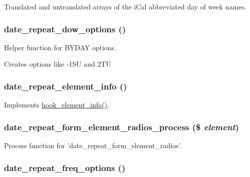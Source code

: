 Translated and untranslated arrays of the iCal abbreviated day of week names. \hypertarget{date__repeat_8module_a0db2cd4cff89bce5add79b4e73a10535}{
\subsubsection[{date\_\-repeat\_\-dow\_\-options}]{\setlength{\rightskip}{0pt plus 5cm}date\_\-repeat\_\-dow\_\-options ()}}
\label{date__repeat_8module_a0db2cd4cff89bce5add79b4e73a10535}
Helper function for BYDAY options.

Creates options like -\/1SU and 2TU \hypertarget{date__repeat_8module_ac3359bf013cf5935d9e568b487ac998d}{
\subsubsection[{date\_\-repeat\_\-element\_\-info}]{\setlength{\rightskip}{0pt plus 5cm}date\_\-repeat\_\-element\_\-info ()}}
\label{date__repeat_8module_ac3359bf013cf5935d9e568b487ac998d}
Implements \hyperlink{group__hooks_ga3c5182432eddc82f8b7845e66a365d51}{hook\_\-element\_\-info()}. \hypertarget{date__repeat_8module_a8cfb8bcf609bee5a14b40fd7b6d918d1}{
\subsubsection[{date\_\-repeat\_\-form\_\-element\_\-radios\_\-process}]{\setlength{\rightskip}{0pt plus 5cm}date\_\-repeat\_\-form\_\-element\_\-radios\_\-process (\$ {\em element})}}
\label{date__repeat_8module_a8cfb8bcf609bee5a14b40fd7b6d918d1}
Process function for 'date\_\-repeat\_\-form\_\-element\_\-radios'. \hypertarget{date__repeat_8module_af608a6efa0eeb6869465857d6d88b2d6}{
\subsubsection[{date\_\-repeat\_\-freq\_\-options}]{\setlength{\rightskip}{0pt plus 5cm}date\_\-repeat\_\-freq\_\-options ()}}
